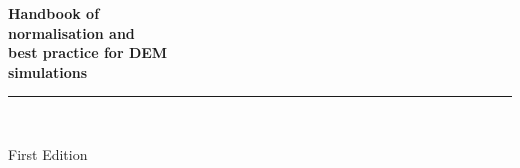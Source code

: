 \documentclass{book}
\title{}
\author{Author Name}
\newcommand{\booksubtitle}{Open Network on DEM Simulations  (ON-DEM)}
\begin{document}
\frontmatter

\begin{titlepage}
\begin{flushleft}

\textbf{\fontsize{28}{34}\selectfont Handbook of \\ normalisation and \\ best practice for DEM \\ simulations}

\par\noindent\rule{\textwidth}{4pt}\\


\begin{flushright}
\Large First Edition
\end{flushright}

\vspace{\fill}

\end{flushleft}
\end{titlepage}
\restoregeometry


\thispagestyle{empty}
\end{document}
